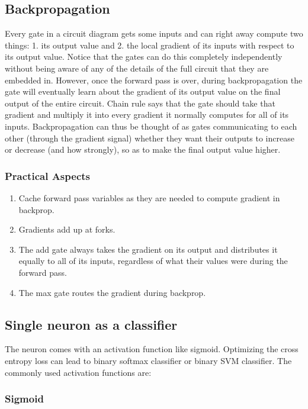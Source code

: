 \documentclass[letterpaper]{article}
\begin{document}
\subsection{Backpropagation}

Every gate in a circuit diagram gets some inputs and can right away compute two things: 1. its output value and 2. the local gradient of its inputs with respect to its output value. Notice that the gates can do this completely independently without being aware of any of the details of the full circuit that they are embedded in. However, once the forward pass is over, during backpropagation the gate will eventually learn about the gradient of its output value on the final output of the entire circuit. Chain rule says that the gate should take that gradient and multiply it into every gradient it normally computes for all of its inputs. Backpropagation can thus be thought of as gates communicating to each other (through the gradient signal) whether they want their outputs to increase or decrease (and how strongly), so as to make the final output value higher.

\subsubsection{Practical Aspects}

\begin{enumerate}
	\item Cache forward pass variables as they are needed to compute gradient in backprop.
	\item Gradients add up at forks.
	\item The add gate always takes the gradient on its output and distributes it equally to all of its inputs, regardless of what their values were during the forward pass. 
	\item The max gate routes the gradient during backprop.
\end{enumerate}

\subsection{Single neuron as a classifier}

The neuron comes with an activation function like sigmoid. Optimizing the cross entropy loss can lead to binary softmax classifier or binary SVM classifier. The commonly used activation functions are:

\subsubsection{Sigmoid}
\end{document}
